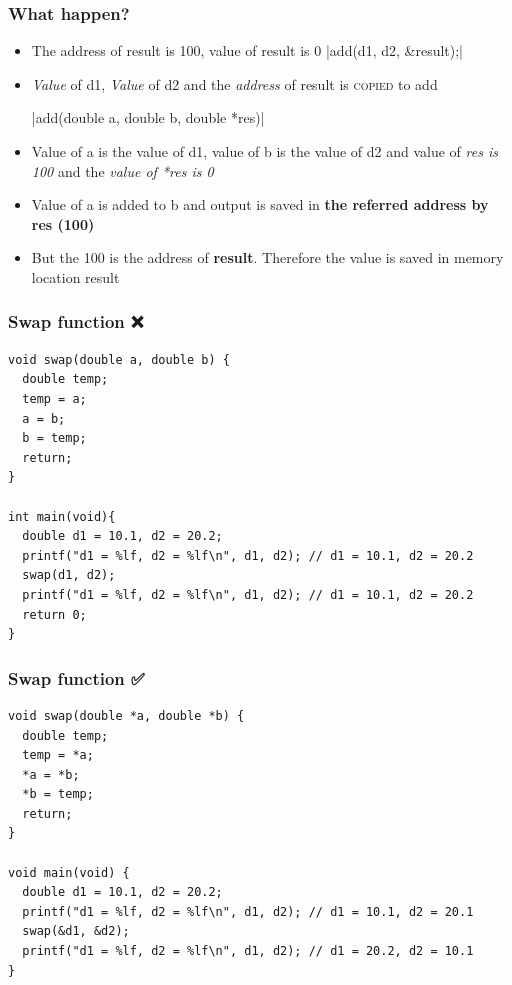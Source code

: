 \documentclass{../c-lecture}
\begin{document}
\begin{frame}[fragile]
  \frametitle{What happen?}
  \begin{itemize}
    |double result = 0;|
    \item The address of result is 100, value of result is 0
    |add(d1, d2, &result);|
    \item
      \textit{\color{YellowOrange} Value} of d1,
      \textit{\color{YellowOrange} Value} of d2 and the
      \textit{\color{LimeGreen} address} of result is
      \textsc{\color{Purple} copied} to add

    |add(double a, double b, double *res)|
    \item
      Value of a is the value of d1, value of b is the value of d2 and value
      of \textit{\color{LimeGreen} res is 100} and the
      \textit{\color{YellowOrange} value of *res is 0}
  \end{itemize}
\end{frame}

\begin{frame}[fragile]
  \begin{itemize}
    |*res = a + b;|
    \item
      Value of a is added to b and output is saved in
      \textbf{\color{YellowOrange} the referred address by res (100)}
    \item
      But the 100 is the address of \textbf{\color{Cyan} result}.
      Therefore the value is saved in memory location result
  \end{itemize}
\end{frame}

\begin{frame}[fragile]
  \frametitle{Swap function ❌}
  \scriptsize
  \begin{verbatim}
void swap(double a, double b) {
  double temp;
  temp = a;
  a = b;
  b = temp;
  return;
}

int main(void){
  double d1 = 10.1, d2 = 20.2;
  printf("d1 = %lf, d2 = %lf\n", d1, d2); // d1 = 10.1, d2 = 20.2
  swap(d1, d2);
  printf("d1 = %lf, d2 = %lf\n", d1, d2); // d1 = 10.1, d2 = 20.2
  return 0;
}
  \end{verbatim}
\end{frame}

\begin{frame}[fragile]
  \frametitle{Swap function ✅}
  \scriptsize
  \begin{verbatim}
void swap(double *a, double *b) {
  double temp;
  temp = *a;
  *a = *b;
  *b = temp;
  return;
}

void main(void) {
  double d1 = 10.1, d2 = 20.2;
  printf("d1 = %lf, d2 = %lf\n", d1, d2); // d1 = 10.1, d2 = 20.1
  swap(&d1, &d2);
  printf("d1 = %lf, d2 = %lf\n", d1, d2); // d1 = 20.2, d2 = 10.1
}
  \end{verbatim}
\end{frame}
\end{document}
